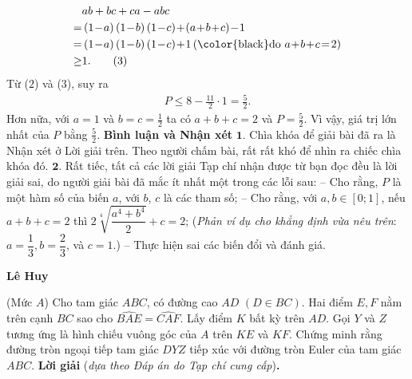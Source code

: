 \begin{multicols}{2}
\begin{align*}
			&ab + bc + ca - abc\\
			 = &\left( {1 \!- \!a} \right)\left( {1 \!-\! b} \right)\left( {1 \!-\! c} \right) \!+\! \left( {a \!+\! b \!+\! c} \right) \!-\! 1\\
			= &\left( {1 \!-\! a} \right)\left( {1 \!-\! b} \right)\left( {1 \!-\! c} \right) \!+\! 1\left( {{\text{\color{black}do }}a \!+\! b \!+\! c \!=\! 2} \right)\\
			\ge &1. \tag{$3$}
	\end{align*}
	Từ ($2$) và ($3$), suy ra
	\begin{align*}
		P \le 8 - \frac{{11}}{2} \cdot 1 = \frac{5}{2}.
	\end{align*}
	Hơn nữa, với $a = 1$ và $b = c   = \frac{1}{2}$  ta có $a + b + c = 2$ và  $P = \frac{5}{2}$.
	\vskip 0.05cm 
	Vì vậy, giá trị lớn nhất của $P$ bằng $\frac{5}{2}$.
	\vskip 0.05cm  
	\textbf{\color{thachthuctoanhoc}Bình luận và Nhận xét}
	\vskip 0.05cm
	$\pmb{1.}$ Chìa khóa để giải bài đã ra là Nhận xét ở Lời giải trên. Theo người chấm bài, rất rất khó để nhìn ra chiếc chìa khóa đó.
	\vskip 0.05cm
	$\pmb{2.}$ Rất tiếc, tất cả các lời giải Tạp chí nhận được từ bạn đọc đều là lời giải sai, do người giải bài đã mắc ít nhất một trong các \linebreak lỗi sau:
	\vskip 0.05cm
	-- Cho rằng, $P$ là một hàm số của biến $a$, với $b$, $c$ là các tham số;
	\vskip 0.05cm
	-- Cho rằng, với  $a,b \in [0;1]$, nếu $a + b + c = 2$ thì  $2\sqrt[4]{{\dfrac{{{a^4} + {b^4}}}{2}}} + c = 2$;
	\vskip 0.05cm
	(\textit{Phản ví dụ cho khẳng định vừa nêu trên}: \linebreak $a = \dfrac{1}{3}, b = \dfrac{2}{3}$, và $c = 1$.)
	\vskip 0.05cm
	-- Thực hiện sai các biến đổi và đánh giá.
	\begin{flushright}
		\textbf{\color{thachthuctoanhoc}Lê Huy}
	\end{flushright}
	{}
	(Mức $A$) Cho tam giác $ABC$, có đường cao $AD$ $(D\in BC)$. Hai điểm $E,F$ nằm trên cạnh $BC$ sao cho $\widehat{BAE}=\widehat{CAF}$. Lấy điểm $K$ bất kỳ trên $AD$. Gọi $Y$ và $Z$ tương ứng là hình chiếu vuông góc của $A$ trên $KE$ và $KF$. Chứng minh rằng đường tròn ngoại tiếp tam giác $DYZ$ tiếp xúc với đường tròn Euler của tam giác $ABC$.
	\vskip 0.05cm
	\textbf{\color{thachthuctoanhoc}Lời giải} (\textit{dựa theo Đáp án do Tạp chí cung cấp})\textbf{\color{thachthuctoanhoc}.}
	\begin{figure}[H]
		\centering
		\captionsetup{labelformat= empty, justification=centering}

\end{figure}
\end{multicols}
